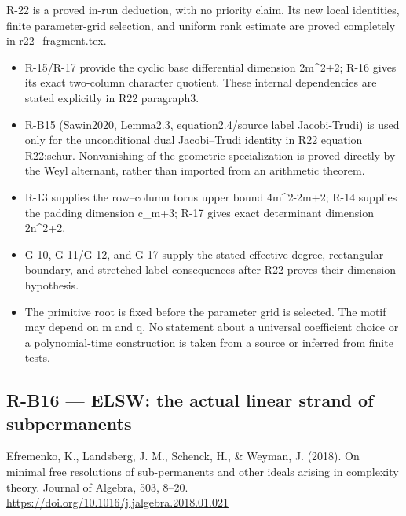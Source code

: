 \documentclass[11pt,a4paper]{article}
\providecommand{\tightlist}{\setlength{\itemsep}{0pt}\setlength{\parskip}{0pt}}
\theoremstyle{definition}\newtheorem{definition}{Definition}
\begin{document}
R-22 is a proved in-run deduction, with no priority claim. Its new local
identities, finite parameter-grid selection, and uniform rank estimate
are proved completely in r22\_fragment.tex.

\begin{itemize}
\tightlist
\item
  R-15/R-17 provide the cyclic base differential dimension 2m\^{}2+2;
  R-16 gives its exact two-column character quotient. These internal
  dependencies are stated explicitly in R22 paragraph3.
\item
  R-B15 (Sawin2020, Lemma2.3, equation2.4/source label Jacobi-Trudi) is
  used only for the unconditional dual Jacobi--Trudi identity in R22
  equation R22:schur. Nonvanishing of the geometric specialization is
  proved directly by the Weyl alternant, rather than imported from an
  arithmetic theorem.
\item
  R-13 supplies the row--column torus upper bound 4m\^{}2-2m+2; R-14
  supplies the padding dimension c\_m+3; R-17 gives exact determinant
  dimension 2n\^{}2+2.
\item
  G-10, G-11/G-12, and G-17 supply the stated effective degree,
  rectangular boundary, and stretched-label consequences after R22
  proves their dimension hypothesis.
\item
  The primitive root is fixed before the parameter grid is selected. The
  motif may depend on m and q. No statement about a universal
  coefficient choice or a polynomial-time construction is taken from a
  source or inferred from finite tests.
\end{itemize}

\subsection{R-B16 --- ELSW: the actual linear strand of
subpermanents}\label{r-b16--elsw-the-actual-linear-strand-of-subpermanents}

Efremenko, K., Landsberg, J. M., Schenck, H., \& Weyman, J. (2018). On
minimal free resolutions of sub-permanents and other ideals arising in
complexity theory. Journal of Algebra, 503, 8--20.
\url{https://doi.org/10.1016/j.jalgebra.2018.01.021}
\end{document}
